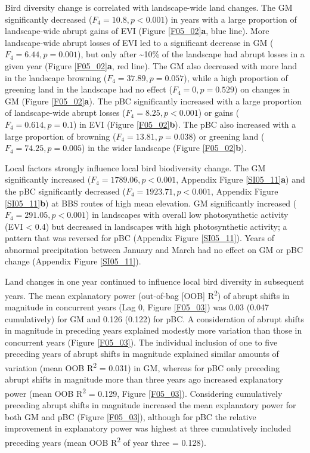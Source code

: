 Bird diversity change is correlated with landscape-wide land changes. The GM significantly decreased ($F_{4} = 10.8, p < 0.001$) in years with a large proportion of landscape-wide abrupt gains of EVI (Figure \ref{F05_02}\textbf{a}, blue line). More landscape-wide abrupt losses of EVI led to a significant decrease in GM ($F_{4} = 6.44, p = 0.001$), but only after \textasciitilde 10\% of the landscape had abrupt losses in a given year (Figure \ref{F05_02}\textbf{a}, red line). The GM also decreased with more land in the landscape browning ($F_{4} = 37.89, p = 0.057$), while a high proportion of greening land in the landscape had no effect ($F_{4} = 0, p = 0.529$) on changes in GM (Figure \ref{F05_02}\textbf{a}). The pBC significantly increased with a large proportion of landscape-wide abrupt losses ($F_{4} = 8.25, p < 0.001$) or gains ($F_{4} = 0.614, p = 0.1$) in EVI (Figure \ref{F05_02}\textbf{b}). The pBC also increased with a large proportion of browning ($F_{4} = 13.81, p = 0.038$) or greening land ($F_{4} = 74.25, p = 0.005$) in the wider landscape (Figure \ref{F05_02}\textbf{b}).

Local factors strongly influence local bird biodiversity change. The GM significantly increased ($F_{4} = 1789.06, p < 0.001$, Appendix Figure \ref{SI05_11}\textbf{a}) and the pBC significantly decreased ($F_{4} = 1923.71, p < 0.001$, Appendix Figure \ref{SI05_11}\textbf{b}) at BBS routes of high mean elevation. GM significantly increased ($F_{4} = 291.05, p < 0.001$) in landscapes with overall low photosynthetic activity (EVI < 0.4) but decreased in landscapes with high photosynthetic activity; a pattern that was reversed for pBC (Appendix Figure \ref{SI05_11}). Years of abnormal precipitation between January and March had no effect on GM or pBC change (Appendix Figure \ref{SI05_11}).

Land changes in one year continued to influence local bird diversity in subsequent years. The mean explanatory power (out-of-bag [OOB] R\textsuperscript{2}) of abrupt shifts in magnitude in concurrent years (Lag 0, Figure \ref{F05_03}) was 0.03 (0.047 cumulatively) for GM and 0.126 (0.122) for pBC. A consideration of abrupt shifts in magnitude in preceding years explained modestly more variation than those in concurrent years (Figure \ref{F05_03}). The individual inclusion of one to five preceding years of abrupt shifts in magnitude explained similar amounts of variation (mean OOB R\textsuperscript{2} = 0.031) in GM, whereas for pBC only preceding abrupt shifts in magnitude more than three years ago increased explanatory power (mean OOB R\textsuperscript{2} = 0.129, Figure \ref{F05_03}). Considering cumulatively preceding abrupt shifts in magnitude increased the mean explanatory power for both GM and pBC (Figure \ref{F05_03}), although for pBC the relative improvement in explanatory power was highest at three cumulatively included preceding years (mean OOB R\textsuperscript{2} of year three = 0.128).


